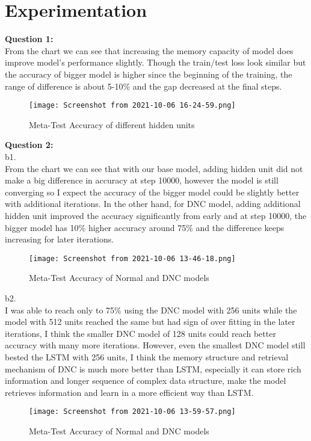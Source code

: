 \documentclass[]{article}
\begin{document}
	
	\section{Experimentation}
	
	\textbf{Question 1:} \\
	From the chart we can see that increasing the memory capacity of model does improve model's performance slightly. Though the train/test loss look similar but the accuracy of bigger model is higher since the beginning of the training, the range of difference is about 5-10\% and the gap decreased at the final steps. \\
	
	\begin{center} 
		\begin{figure}[H]
			\centering
			\texttt{[image: Screenshot from 2021-10-06 16-24-59.png]}
			\caption{Meta-Test Accuracy of different hidden units}
		\end{figure}
	\end{center}
	
	\textbf{Question 2:} \\
	b1.\\
	
	From the chart we can see that with our base model, adding hidden unit did not make a big difference in accuracy at step 10000, however the model is still converging so I expect the accuracy of the bigger model could be slightly better with additional iterations. In the other hand, for DNC model, adding additional hidden unit improved the accuracy significantly from early and at step 10000, the bigger model has 10\% higher accuracy around 75\% and the difference keeps increasing for later iterations.
	
	\begin{center} 
		\begin{figure}[H]
			\centering
			\texttt{[image: Screenshot from 2021-10-06 13-46-18.png]}
			\caption{Meta-Test Accuracy of Normal and DNC models}
		\end{figure}
	\end{center}
	b2.\\ 
	
	I was able to reach only to 75\% using the DNC model with 256 units while the model with 512 units reached the same but had sign of over fitting in the later iterations, I think the smaller DNC model of 128 units could reach better accuracy with many more iterations. However, even the smallest DNC model still bested the LSTM with 256 units, I think the memory structure and retrieval mechanism of DNC is much more better than LSTM, especially it can store rich information and longer sequence of complex data structure, make the model retrieves information and learn in a more efficient way than LSTM. 
	
	\begin{center} 
		\begin{figure}[H]
			\centering
			\texttt{[image: Screenshot from 2021-10-06 13-59-57.png]}
			\caption{Meta-Test Accuracy of Normal and DNC models}
		\end{figure}
	\end{center}
	
\end{document}
